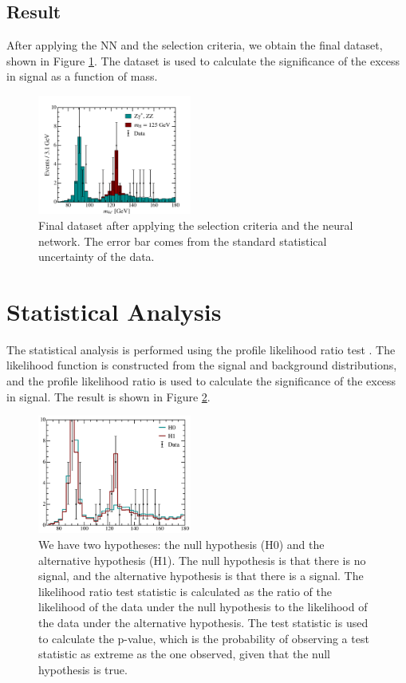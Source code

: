\subsection{Result}

After applying the NN and the selection criteria, we obtain the final dataset, shown in Figure \ref{fig:dataset}. The dataset is used to calculate the significance of the excess in signal as a function of mass.

\begin{figure}[h]
  \centering
  \includegraphics[width=0.45\textwidth]{Figures/data.png}
  \caption{Final dataset after applying the selection criteria and the neural network. The error bar comes from the standard statistical uncertainty of the data.}
  \label{fig:dataset}
\end{figure}


\section{Statistical Analysis}
The statistical analysis is performed using the profile likelihood ratio test \cite{Cowan:2010js}. The likelihood function is constructed from the signal and background distributions, and the profile likelihood ratio is used to calculate the significance of the excess in signal. The result is shown in Figure \ref{fig:likelihood}. 
\begin{figure}[h]
  \centering
  \includegraphics[width=0.45\textwidth]{Figures/hypo_testing.png}
  \caption{We have two hypotheses: the null hypothesis (H0) and the alternative hypothesis (H1). The null hypothesis is that there is no signal, and the alternative hypothesis is that there is a signal. The likelihood ratio test statistic is calculated as the ratio of the likelihood of the data under the null hypothesis to the likelihood of the data under the alternative hypothesis. The test statistic is used to calculate the p-value, which is the probability of observing a test statistic as extreme as the one observed, given that the null hypothesis is true.}
  \label{fig:likelihood}
\end{figure}


